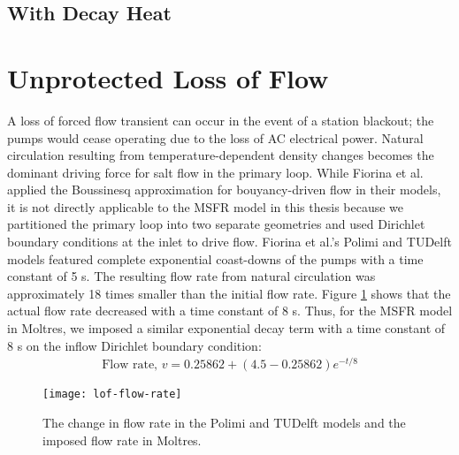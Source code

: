 \subsection{With Decay Heat}

\clearpage

\section{Unprotected Loss of Flow}

A loss of forced flow transient can occur in the event of a station
blackout; the pumps would cease operating due to the loss of AC electrical
power. Natural circulation resulting from temperature-dependent density
changes becomes the dominant driving force for salt flow in the primary loop.
While Fiorina et al. \cite{fiorina_modelling_2014} applied the Boussinesq
approximation for bouyancy-driven flow in their models, it is not directly
applicable to the \gls{MSFR} model in this thesis because we partitioned the
primary loop into two separate geometries and used Dirichlet boundary
conditions at the inlet to drive flow. Fiorina et al.'s Polimi and TUDelft
models featured complete exponential coast-downs of the pumps with a time
constant of 5 s. The resulting flow rate from natural circulation was
approximately 18 times smaller than the initial flow rate. Figure
\ref{fig:flowrate} shows that the actual flow rate decreased with a time
constant of 8 s. Thus, for the \gls{MSFR} model in Moltres, we imposed a
similar exponential decay term with a time constant of 8 s on the inflow
Dirichlet boundary condition:
%
\begin{align}
    \text{Flow rate, } v = 0.25862 + (4.5-0.25862) e^{-t/8} 
    \label{eq:flowrate}
\end{align}

\begin{figure}[htbp!]
    \centering
    \texttt{[image: lof-flow-rate]}
    \caption{The change in flow rate in the Polimi and TUDelft models and the
    imposed flow rate in Moltres.}
    \label{fig:flowrate}
\end{figure}

